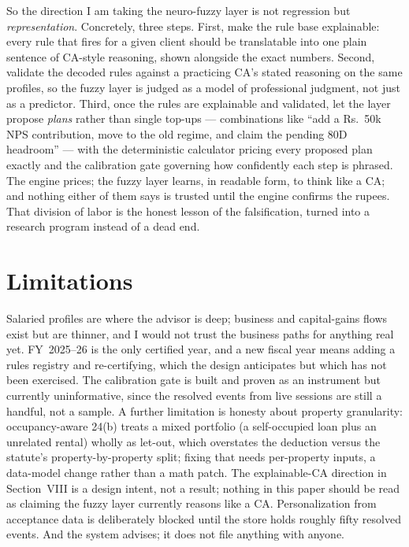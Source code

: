 \documentclass[conference]{IEEEtran}
\begin{document}
So the direction I am taking the neuro-fuzzy layer is not regression
but \emph{representation}. Concretely, three steps. First, make the
rule base explainable: every rule that fires for a given client should
be translatable into one plain sentence of CA-style reasoning, shown
alongside the exact numbers. Second, validate the decoded rules
against a practicing CA's stated reasoning on the same profiles, so
the fuzzy layer is judged as a model of professional judgment, not
just as a predictor. Third, once the rules are explainable and
validated, let the layer propose \emph{plans} rather than single
top-ups --- combinations like ``add a Rs.~50k NPS contribution, move
to the old regime, and claim the pending 80D headroom'' --- with the
deterministic calculator pricing every proposed plan exactly and the
calibration gate governing how confidently each step is phrased. The
engine prices; the fuzzy layer learns, in readable form, to think like
a CA; and nothing either of them says is trusted until the engine
confirms the rupees. That division of labor is the honest lesson of
the falsification, turned into a research program instead of a dead
end.

\section{Limitations}
Salaried profiles are where the advisor is deep; business and
capital-gains flows exist but are thinner, and I would not trust the
business paths for anything real yet. FY~2025--26 is the only certified
year, and a new fiscal year means adding a rules registry and
re-certifying, which the design anticipates but which has not been
exercised. The calibration gate is built and proven as an instrument
but currently uninformative, since the resolved events from live
sessions are still a handful, not a sample. A further limitation is
honesty about property granularity: occupancy-aware 24(b) treats a
mixed portfolio (a self-occupied loan plus an unrelated rental) wholly
as let-out, which overstates the deduction versus the statute's
property-by-property split; fixing that needs per-property inputs, a
data-model change rather than a math patch.
The explainable-CA direction in Section~VIII is a design intent, not a
result; nothing in this paper should be read as claiming the fuzzy
layer currently reasons like a CA. Personalization from acceptance
data is deliberately blocked until the store holds roughly fifty
resolved events. And the system advises; it does not file anything
with anyone.
\end{document}
